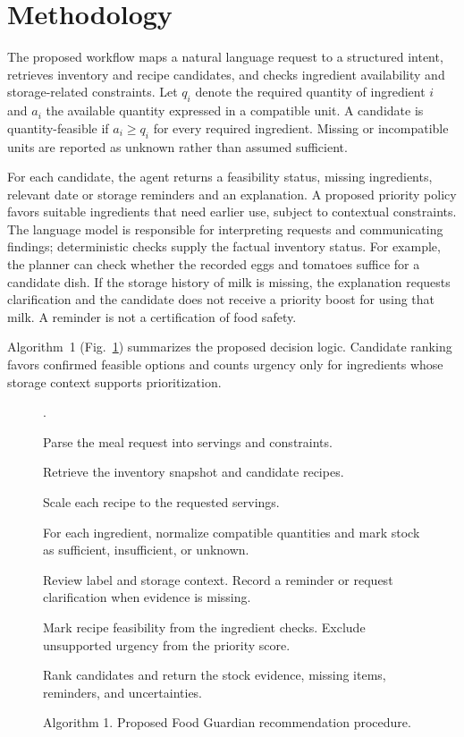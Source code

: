 \section{Methodology}
The proposed workflow maps a natural language request to a structured intent, retrieves inventory and recipe candidates, and checks ingredient availability and storage-related constraints. Let $q_i$ denote the required quantity of ingredient $i$ and $a_i$ the available quantity expressed in a compatible unit. A candidate is quantity-feasible if $a_i\geq q_i$ for every required ingredient. Missing or incompatible units are reported as unknown rather than assumed sufficient.

For each candidate, the agent returns a feasibility status, missing ingredients, relevant date or storage reminders and an explanation. A proposed priority policy favors suitable ingredients that need earlier use, subject to contextual constraints. The language model is responsible for interpreting requests and communicating findings; deterministic checks supply the factual inventory status. For example, the planner can check whether the recorded eggs and tomatoes suffice for a candidate dish. If the storage history of milk is missing, the explanation requests clarification and the candidate does not receive a priority boost for using that milk. A reminder is not a certification of food safety.

Algorithm~1 (Fig.~\ref{alg:guardian}) summarizes the proposed decision logic. Candidate ranking favors confirmed feasible options and counts urgency only for ingredients whose storage context supports prioritization.

\begin{figure}[t]
\footnotesize
\begin{list}{.}{%
  \setlength{\leftmargin}{1.65em}%
  \setlength{\labelwidth}{1.15em}%
  \setlength{\labelsep}{0.5em}%
  \setlength{\itemindent}{0pt}%
  \setlength{\itemsep}{1pt}%
  \setlength{\parsep}{0pt}%
  \setlength{\topsep}{2pt}%
  \setlength{\partopsep}{0pt}%
}
\item Parse the meal request into servings and constraints.
\item Retrieve the inventory snapshot and candidate recipes.
\item Scale each recipe to the requested servings.
\item For each ingredient, normalize compatible quantities and mark stock as sufficient, insufficient, or unknown.
\item Review label and storage context. Record a reminder or request clarification when evidence is missing.
\item Mark recipe feasibility from the ingredient checks. Exclude unsupported urgency from the priority score.
\item Rank candidates and return the stock evidence, missing items, reminders, and uncertainties.
\end{list}
\caption{Algorithm 1. Proposed Food Guardian recommendation procedure.}
\label{alg:guardian}
\end{figure}
